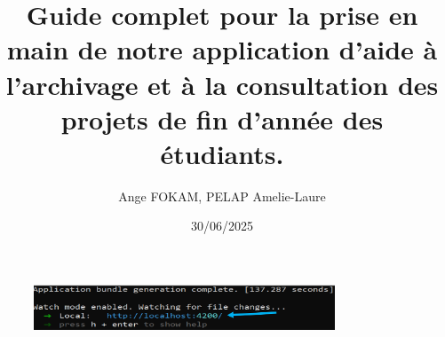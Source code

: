  \begin{figure}[h] 
        \centering 
        \includegraphics[width=0.8\textwidth]{./img/angular.png} 
    \end{figure}



\documentclass[12pt]{article}
\usepackage[utf8]{inputenc}
\usepackage[T1]{fontenc}
\usepackage[french]{babel}
\usepackage{geometry}
\usepackage{listings}
\usepackage{xcolor}
\usepackage{graphicx}
\usepackage{hyperref}
\usepackage{enumitem}
\usepackage{titlesec}

\geometry{a4paper, margin=2.5cm}


\title{Guide complet pour la prise en main de notre application d’aide à l’archivage et à la consultation des projets de fin d'année des étudiants.}
\author{Ange FOKAM, PELAP Amelie-Laure}
\date{30/06/2025}



\maketitle
\clearpage

\tableofcontents
\clearpage

\textbf{\textit{Pour les développeurs et les administrateurs système}}

\rule{\linewidth}{0.2pt}
\section*{À propos du guide :}

\begin{itemize}[label=--]
    \item \textbf{Objectif du guide} : Expliquer comment acquérir les logiciels nécessaires et procéder au déploiement proprement dit de l'application.
    \item \textbf{Public cible} : Administrateurs système futurs et développeurs futurs de l'application.
    \item \textbf{Structure du document} : Deux sections à savoir une pour le matériel à disposer et l'autre pour le déploiement technique de l'application.
    \item \textbf{Prérequis généraux} : Accès au réseau internet, identifiants, connaissances de base en informatique et en programmation web ou mobile.
\end{itemize}

